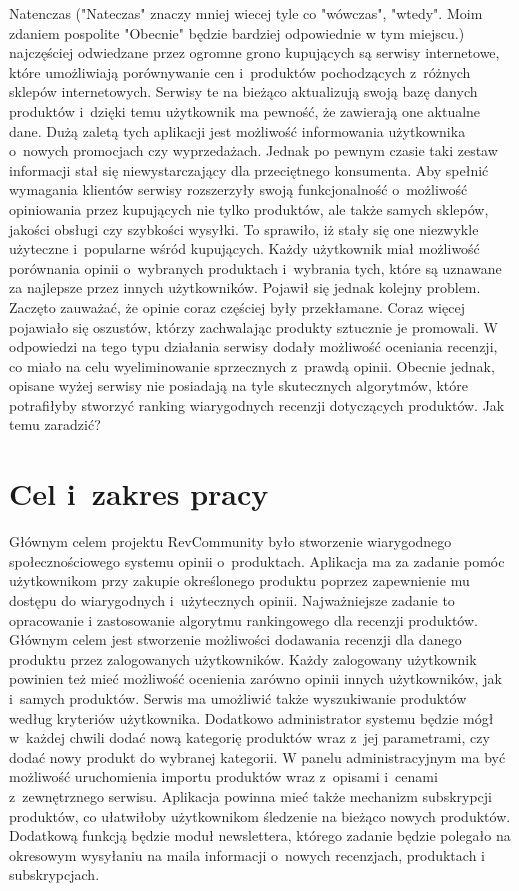 Natenczas ("Nateczas" znaczy mniej wiecej tyle co "wówczas", "wtedy". Moim zdaniem pospolite "Obecnie" będzie bardziej odpowiednie w tym miejscu.) najczęściej odwiedzane przez ogromne grono kupujących są serwisy internetowe, które umożliwiają porównywanie cen i~produktów pochodzących z~różnych sklepów internetowych. Serwisy te na bieżąco aktualizują swoją bazę danych produktów i~dzięki temu użytkownik ma pewność, że zawierają one aktualne dane. Dużą zaletą tych aplikacji jest możliwość informowania użytkownika o~nowych promocjach czy wyprzedażach. Jednak po pewnym czasie taki zestaw informacji stał się niewystarczający dla przeciętnego konsumenta. Aby spełnić wymagania klientów serwisy rozszerzyły swoją funkcjonalność o~możliwość opiniowania przez kupujących nie tylko produktów, ale także samych sklepów, jakości obsługi czy szybkości wysyłki. To sprawiło, iż stały się one niezwykle użyteczne i~popularne wśród kupujących. Każdy użytkownik miał możliwość porównania opinii o~wybranych produktach i~wybrania tych, które są uznawane za najlepsze przez innych użytkowników. Pojawił się jednak kolejny problem. Zaczęto zauważać, że opinie coraz częściej były przekłamane. Coraz więcej pojawiało się oszustów, którzy zachwalając produkty sztucznie je promowali. W odpowiedzi na tego typu działania serwisy dodały możliwość oceniania recenzji, co miało na celu wyeliminowanie sprzecznych z~prawdą opinii. Obecnie jednak, opisane wyżej serwisy nie posiadają na tyle skutecznych algorytmów, które potrafiłyby stworzyć ranking wiarygodnych recenzji dotyczących produktów. Jak temu zaradzić?  
 


\section{Cel i~zakres pracy}
Głównym celem projektu RevCommunity było stworzenie wiarygodnego społecznościowego systemu  opinii o~produktach. Aplikacja ma za zadanie pomóc użytkownikom przy zakupie określonego produktu poprzez zapewnienie mu dostępu do wiarygodnych i~użytecznych opinii. Najważniejsze zadanie to opracowanie i zastosowanie algorytmu rankingowego dla recenzji produktów. Głównym celem jest stworzenie możliwości dodawania recenzji dla danego produktu przez zalogowanych użytkowników. Każdy zalogowany użytkownik powinien też mieć możliwość ocenienia zarówno opinii innych użytkowników, jak i~samych produktów. Serwis ma umożliwić także wyszukiwanie produktów według kryteriów użytkownika. Dodatkowo administrator systemu będzie mógł w~każdej chwili dodać nową kategorię produktów wraz z~jej parametrami, czy dodać nowy produkt do wybranej kategorii. W panelu administracyjnym ma być możliwość uruchomienia importu produktów wraz z~opisami i~cenami z~zewnętrznego serwisu. Aplikacja powinna mieć także mechanizm subskrypcji produktów, co ułatwiłoby użytkownikom śledzenie na bieżąco nowych produktów. Dodatkową funkcją będzie moduł newslettera, którego zadanie będzie polegało na okresowym wysyłaniu na maila informacji o~nowych recenzjach, produktach i subskrypcjach. 

